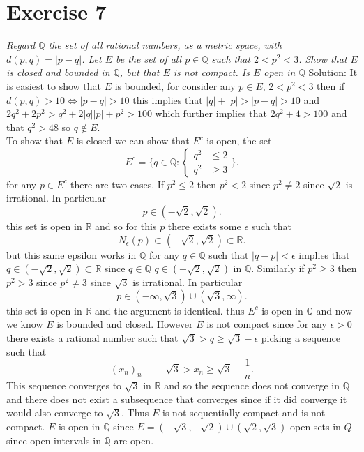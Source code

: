\documentclass[11pt]{article}
\newcommand{\solution}[1]{{{\textcolor{header}{Solution:} \textcolor{solution}{#1}}}}
\begin{document}
\section{Exercise 7}
\emph{
    Regard $ \mathbb{Q} $ the set of all rational numbers, as a metric space, with $d(p,q) = |p-q|$. Let
    $E$ be the set of all $p \in \mathbb{Q}$ such that $2 < p^2 < 3$. Show that $E$ is closed and bounded in $ \mathbb{Q}$, but that $E$ is
    not compact. Is $E$ open in $ \mathbb{Q}$
}
\solution{
    It is easiest to show that $E$ is bounded, for consider any $p \in E$, $2 < p^2 < 3$ then if $d(p,q) > 10 \iff |p-q| > 10$
    this implies that  $|q| + |p| > |p-q| > 10$ and $2q^2 + 2p^2 > q^2 +2|q||p| + p^2 > 100$ which further implies that $2q^2 + 4 > 100$ and that
    $q^2 > 48$ so $q \not\in E$.\\
    To show that  $E$ is closed we can show that $E^{c}$ is open, the set
    \[
    E^{c} = \{q \in \mathbb{Q}:
        \begin{cases}
            q^2 &\le 2 \\
            q^2 &\ge 3 
    \end{cases} \}
    .\] 
    for any $p \in E^{c}$ there are two cases. If $p^2 \le 2$ then $p^2 < 2$ since $p^2 \ne 2$ since $\sqrt{2}$ is irrational. In particular
    \[
    p \in (-\sqrt{2},\sqrt{2})
    .\] 
    this set is open in $  \mathbb{R}$ and so for this $p$ there exists some $ \epsilon$ such that 
    \[
    N_\epsilon(p) \subset (-\sqrt{2},\sqrt{2}) \subset \mathbb{R}
    .\] 
    but this same epsilon works in $\mathbb{Q}$ for any $q \in \mathbb{Q}$ such that $|q-p| < \epsilon$ implies that $q \in (-\sqrt{2},\sqrt{2}) \subset \mathbb{R}$ since $q \in \mathbb{Q}$
    $q \in (-\sqrt{2},\sqrt{2})$ in $ \mathbb{Q}$.
    Similarly if $p^2 \ge 3$ then $p^2 > 3$ since $p^2 \ne 3$ since $\sqrt{3}$ is irrational. In particular
    \[
    p \in (-\infty,\sqrt{3}) \cup (\sqrt{3}, \infty)
    .\] 
    this set is open in $ \mathbb{R}$ and the argument is identical.
    thus $E^{c}$ is open in $ \mathbb{Q}$ and now we know $ E$ is bounded and closed.
    However $E$ is not compact since for any $\epsilon > 0$ there exists a rational number such that $\sqrt{3} > q \ge \sqrt{3} - \epsilon$ 
    picking a sequence such that
    \[
        (x_n)_n \hspace{1cm} \sqrt{3} > x_n \ge \sqrt{3} - \frac{1}{n}
    .\] 
    This sequence converges to $\sqrt{3}$ in $ \mathbb{R}$ and so the sequence does not converge in  $ \mathbb{Q}$ and there does not exist a subsequence that converges
    since if it did converge it would also converge to $ \sqrt{3}$. Thus $E$ is not sequentially compact and is not compact.
    $E$ is open in $ \mathbb{Q}$ since $E = (-\sqrt{3}, -\sqrt{2}) \cup (\sqrt{2}, \sqrt{3})$ open sets in $Q$ since open intervals in $ \mathbb{Q}$ are open.
}
\end{document}
